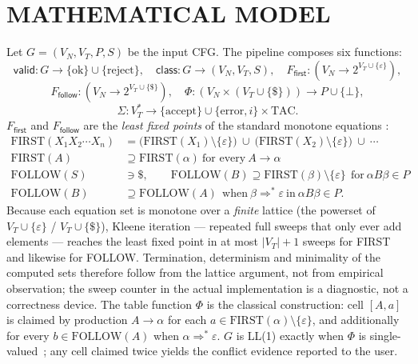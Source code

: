 \documentclass[12pt,a4paper,oneside,openany]{report}
\begin{document}
\section{MATHEMATICAL MODEL}
Let $G=(V_N,V_T,P,S)$ be the input CFG. The pipeline composes six
functions:
\[
  \mathsf{valid} : G \to \{\mathrm{ok}\} \cup \{\mathrm{reject}\},\quad
  \mathsf{class} : G \to (V_N, V_T, S),\quad
  F_{\mathsf{first}} : (V_N \to 2^{V_T \cup \{\varepsilon\}}),
\]
\[
  F_{\mathsf{follow}} : (V_N \to 2^{V_T \cup \{\$ \}}),\quad
  \Phi : (V_N \times (V_T \cup \{\$\})) \to P \cup \{\bot\},
\]
\[
  \Sigma : V_T^{*} \to \{\mathrm{accept}\} \cup
           \{\mathrm{error}, i\} \times \mathrm{TAC}.
\]
$F_{\mathsf{first}}$ and $F_{\mathsf{follow}}$ are the \emph{least
fixed points} of the standard monotone equations
\cite{aho2006compilers, aho1972}:
\begin{align}
  \mathrm{FIRST}(X_1X_2\cdots X_n) &=
     \bigl(\mathrm{FIRST}(X_1)\setminus\{\varepsilon\}\bigr)\ \cup\
     \bigl(\mathrm{FIRST}(X_2)\setminus\{\varepsilon\}\bigr)\ \cup\ \cdots
  \label{eq:firstseq}\\
  \mathrm{FIRST}(A) &\supseteq
     \mathrm{FIRST}(\alpha)\ \text{for every}\ A \to \alpha
  \label{eq:firste}\\
  \mathrm{FOLLOW}(S) &\ni \$, \qquad
  \mathrm{FOLLOW}(B) \supseteq \mathrm{FIRST}(\beta)\setminus\{\varepsilon\}
  \ \ \text{for}\ \alpha B \beta \in P
  \label{eq:foll2}\\
  \mathrm{FOLLOW}(B) &\supseteq \mathrm{FOLLOW}(A)
  \ \ \text{when}\ \beta \Rightarrow^{*} \varepsilon\ \text{in}\ \alpha B
  \beta \in P.
  \label{eq:foll3}
\end{align}
Because each equation set is monotone over a \emph{finite} lattice (the
powerset of $V_T \cup \{\varepsilon\}$ / $V_T \cup \{\$\}$), Kleene
iteration --- repeated full sweeps that only ever add elements --- reaches
the least fixed point in at most $|V_T|+1$ sweeps
for FIRST and likewise for FOLLOW. Termination, determinism and
minimality of the computed sets therefore follow from the lattice
argument, not from empirical observation; the sweep counter in the actual
implementation is a diagnostic, not a correctness device.
The table function $\Phi$ is the classical construction: cell $[A,a]$ is
claimed by production $A \to \alpha$ for each
$a \in \mathrm{FIRST}(\alpha)\setminus\{\varepsilon\}$, and additionally
for every $b \in \mathrm{FOLLOW}(A)$ when $\alpha \Rightarrow^{*}
\varepsilon$. $G$ is LL(1) exactly when $\Phi$ is
single-valued~\cite{aho2006compilers}; any cell claimed twice yields the
conflict evidence reported to the user.
\label{sec:ll1conditions}
\end{document}
